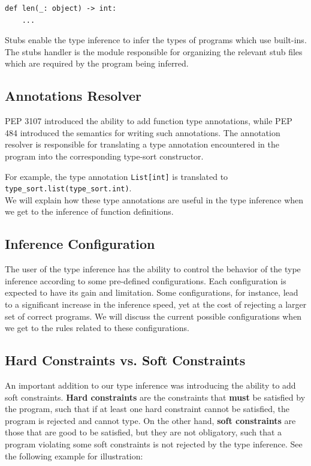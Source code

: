 \begin{lstlisting}
def len(_: object) -> int:
	...
\end{lstlisting}

Stubs enable the type inference to infer the types of programs which use built-ins. The stubs handler is the module responsible for organizing the relevant stub files which are required by the program being inferred.

\subsection{Annotations Resolver}
PEP 3107 \cite{3107} introduced the ability to add function type annotations, while PEP 484 \cite{484} introduced the semantics for writing such annotations. The annotation resolver is responsible for translating a type annotation encountered in the program into the corresponding type-sort constructor.

For example, the type annotation \lstinline|List[int]| is translated to \lstinline|type_sort.list(type_sort.int)|.\\

We will explain how these type annotations are useful in the type inference when we get to the inference of function definitions.
\subsection{Inference Configuration}
The user of the type inference has the ability to control the behavior of the type inference according to some pre-defined configurations. Each configuration is expected to have its gain and limitation. Some configurations, for instance, lead to a significant increase in the inference speed, yet at the cost of rejecting a larger set of correct programs. We will discuss the current possible configurations when we get to the rules related to these configurations.
\subsection{Hard Constraints vs. Soft Constraints}
An important addition to our type inference was introducing the ability to add soft constraints. \textbf{Hard constraints} are the constraints that \textbf{must} be satisfied by the program, such that if at least one hard constraint cannot be satisfied, the program is rejected and cannot type. On the other hand, \textbf{soft constraints} are those that are good to be satisfied, but they are not obligatory, such that a program violating some soft constraints is not rejected by the type inference. See the following example for illustration:

